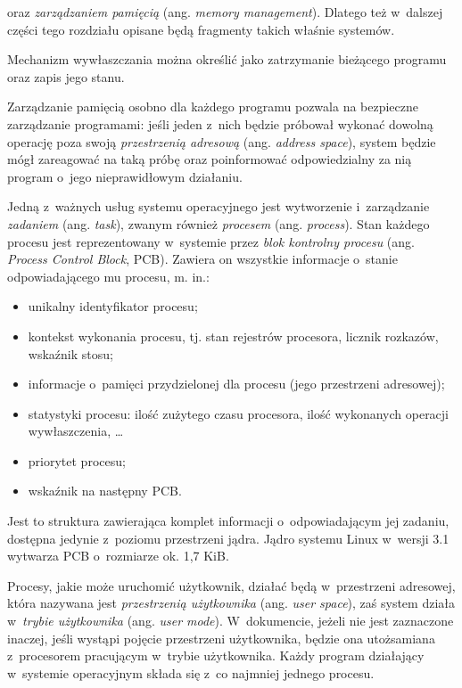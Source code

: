 \documentclass[12pt]{mwart}
\begin{document}
  oraz \emph{zarządzaniem pamięcią} (ang. \emph{memory management}). Dlatego też w~dalszej części tego rozdziału opisane będą fragmenty takich właśnie systemów.
\par
%
\indent
  Mechanizm wywłaszczania można określić jako zatrzymanie bieżącego programu oraz zapis jego stanu.
\par
%
\indent
  Zarządzanie pamięcią osobno dla każdego programu pozwala na bezpieczne zarządzanie programami: jeśli jeden z~nich będzie próbował wykonać dowolną operację
  poza swoją \emph{przestrzenią adresową} (ang. \emph{address space}), system będzie mógł zareagować na taką próbę oraz poinformować odpowiedzialny za nią program
  o~jego nieprawidłowym działaniu.
\par
%
\indent
  Jedną z~ważnych usług systemu operacyjnego jest wytworzenie i~zarządzanie \emph{zadaniem} (ang. \emph{task}), zwanym również \emph{procesem}
  (ang. \emph{process}). Stan każdego procesu jest reprezentowany w~systemie przez \emph{blok kontrolny procesu} (ang. \emph{Process Control Block}, PCB).
  Zawiera on wszystkie informacje o~stanie odpowiadającego mu procesu, m. in.:
  \begin{itemize}
    \item unikalny identyfikator procesu;
    \item kontekst wykonania procesu, tj. stan rejestrów procesora, licznik rozkazów, wskaźnik stosu;
    \item informacje o~pamięci przydzielonej dla procesu (jego przestrzeni adresowej);
    \item statystyki procesu: ilość zużytego czasu procesora, ilość wykonanych operacji wywłaszczenia, \ldots
    \item priorytet procesu;
    \item wskaźnik na następny PCB.
  \end{itemize}
  Jest to struktura zawierająca komplet informacji o~odpowiadającym jej zadaniu, dostępna jedynie z~poziomu przestrzeni jądra.
  Jądro systemu Linux w~wersji 3.1 wytwarza PCB o~rozmiarze ok. 1,7 KiB.
\par
%
\indent
  Procesy, jakie może uruchomić użytkownik, działać będą w~przestrzeni adresowej, która nazywana jest \emph{przestrzenią użytkownika} (ang. \emph{user space}), zaś
  system działa w~\emph{trybie użytkownika} (ang. \emph{user mode}). W~dokumencie, jeżeli nie jest zaznaczone inaczej,
  jeśli wystąpi pojęcie przestrzeni użytkownika, będzie ona utożsamiana z~procesorem pracującym w~trybie użytkownika.
  Każdy program działający w~systemie operacyjnym składa się z~co najmniej jednego procesu.
\end{document}
